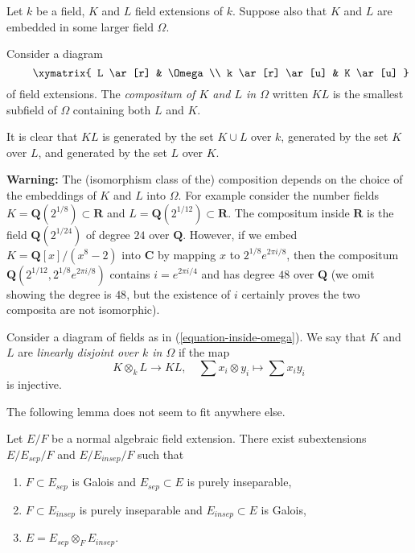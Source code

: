 \noindent
Let $k$ be a field, $K$ and $L$ field extensions of $k$.
Suppose also that $K$ and $L$ are embedded in some larger field $\Omega$.

\begin{definition}
\label{definition-compositum}
Consider a diagram
\begin{equation}
\label{equation-inside-omega}
\vcenter{
\xymatrix{
L \ar[r] & \Omega \\
k \ar[r] \ar[u] & K \ar[u]
}
}
\end{equation}
of field extensions. The {\it compositum of $K$ and $L$ in $\Omega$}
written $KL$ is the smallest subfield of $\Omega$ containing both
$L$ and $K$.
\end{definition}

\noindent
It is clear that $KL$ is generated by the set $K \cup L$ over $k$,
generated by the set $K$ over $L$, and generated by the set $L$ over $K$.

\medskip\noindent
{\bf Warning:} The (isomorphism class of the) composition depends on
the choice of the embeddings of $K$ and $L$ into $\Omega$. For example
consider the number fields $K = \mathbf{Q}(2^{1/8}) \subset \mathbf{R}$ and
$L = \mathbf{Q}(2^{1/12}) \subset \mathbf{R}$. The compositum inside
$\mathbf{R}$ is the field $\mathbf{Q}(2^{1/24})$ of degree $24$ over
$\mathbf{Q}$. However, if we embed $K = \mathbf{Q}[x]/(x^8 - 2)$ into
$\mathbf{C}$ by mapping $x$ to $2^{1/8}e^{2\pi i/8}$, then the compositum
$\mathbf{Q}(2^{1/12}, 2^{1/8}e^{2\pi i/8})$ contains $i = e^{2\pi i/4}$ and has
degree $48$ over $\mathbf{Q}$ (we omit showing the degree is $48$, but
the existence of $i$ certainly proves the two composita are not isomorphic).

\begin{definition}
\label{definition-linearly-disjoint}
Consider a diagram of fields as in (\ref{equation-inside-omega}).
We say that $K$ and $L$ are {\it linearly disjoint over $k$ in $\Omega$}
if the map
$$
K \otimes_k L \longrightarrow KL,\quad
\sum x_i \otimes y_i \longmapsto \sum x_i y_i
$$
is injective.
\end{definition}

\noindent
The following lemma does not seem to fit anywhere else.

\begin{lemma}
\label{lemma-normal-case}
Let $E/F$ be a normal algebraic field extension. There exist subextensions
$E / E_{sep} /F$ and $E / E_{insep} / F$ such that
\begin{enumerate}
\item $F \subset E_{sep}$ is Galois and $E_{sep} \subset E$
is purely inseparable,
\item $F \subset E_{insep}$ is purely inseparable and $E_{insep} \subset E$
is Galois,
\item $E = E_{sep} \otimes_F E_{insep}$.
\end{enumerate}
\end{lemma}

